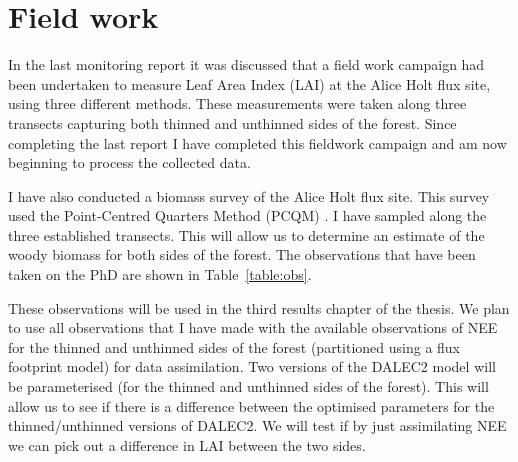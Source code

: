 \documentclass[11pt]{article}
\begin{document}
\section{Field work} \label{sec:fieldwork}

In the last monitoring report it was discussed that a field work campaign had been undertaken to measure Leaf Area Index (LAI) at the Alice Holt flux site, using three different methods. These measurements were taken along three transects capturing both thinned and unthinned sides of the forest. Since completing the last report I have completed this fieldwork campaign and am now beginning to process the collected data.

I have also conducted a biomass survey of the Alice Holt flux site. This survey used the Point-Centred Quarters Method (PCQM) \citep{dahdouh2006empirical}. I have sampled along the three established transects. This will allow us to determine an estimate of the woody biomass for both sides of the forest. The observations that have been taken on the PhD are shown in Table~\ref{table:obs}. 

These observations will be used in the third results chapter of the thesis. We plan to use all observations that I have made with the available observations of NEE for the thinned and unthinned sides of the forest (partitioned using a flux footprint model) for data assimilation. Two versions of the DALEC2 model will be parameterised (for the thinned and unthinned sides of the forest). This will allow us to see if there is a difference between the optimised parameters for the thinned/unthinned versions of DALEC2. We will test if by just assimilating NEE we can pick out a difference in LAI between the two sides. 
\end{document}
